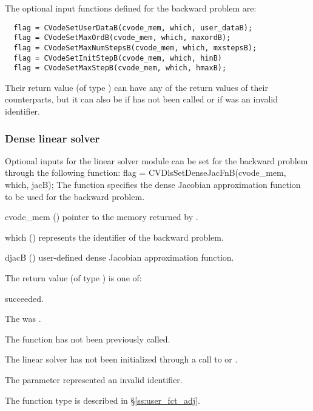 The optional input functions defined for the backward problem are:
\begin{verbatim}
  flag = CVodeSetUserDataB(cvode_mem, which, user_dataB);
  flag = CVodeSetMaxOrdB(cvode_mem, which, maxordB);
  flag = CVodeSetMaxNumStepsB(cvode_mem, which, mxstepsB);
  flag = CVodeSetInitStepB(cvode_mem, which, hinB)
  flag = CVodeSetMaxStepB(cvode_mem, which, hmaxB);
\end{verbatim}
Their return value  (of type ) can have any of the return values 
of their counterparts, but it can also be  if  
has not been called or  if  was an invalid identifier. 


\subsubsection{Dense linear solver}
Optional inputs for the {\cvdense} linear solver module can be set for the backward
problem through the following function:
{
  flag = CVDlsSetDenseJacFnB(cvode\_mem, which, jacB);
}
{
  The function  specifies the dense Jacobian
  approximation function to be used for the backward problem.
}
{
  \begin{args}
  \item[cvode\_mem] ()
    pointer to the {\cvodes} memory returned by .
  \item[which] ()
    represents the identifier of the backward problem.
  \item[djacB] ()
    user-defined dense Jacobian approximation function.
  \end{args}
}
{
  The return value  (of type ) is one of:
  \begin{args}
  \item[\Id{CVDIRECT\_SUCCESS}] 
     succeeded.
  \item[\Id{CVDIRECT\_MEM\_NULL}]
    The  was .
  \item[\Id{CVDIRECT\_NO\_ADJ}]
    The function  has not been previously called.
  \item[\Id{CVDIRECT\_LMEM\_NULL}]
    The linear solver has not been initialized through a call to 
    or .
  \item[\Id{CVDIRECT\_ILL\_INPUT}]
    The parameter  represented an invalid identifier.
  \end{args}
}
{
  The function type  is described in \S\ref{ss:user_fct_adj}.
}


